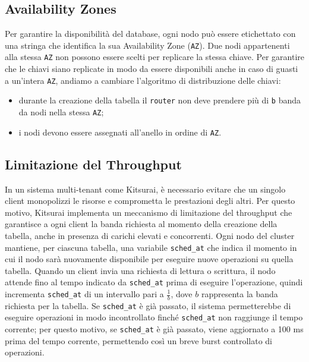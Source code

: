\subsection{Availability Zones}
\label{subsec:availability-zones}

Per garantire la disponibilità del database, ogni nodo può essere etichettato con una stringa che identifica la sua Availability Zone (\texttt{AZ}).
Due nodi appartenenti alla stessa \texttt{AZ} non possono essere scelti per replicare la stessa chiave.
Per garantire che le chiavi siano replicate in modo da essere disponibili anche in caso di guasti a un'intera \texttt{AZ}, andiamo a cambiare l'algoritmo di distribuzione delle chiavi:
\begin{itemize}
    \item durante la creazione della tabella il \texttt{router} non deve prendere più di \texttt{b} banda da nodi nella stessa \texttt{AZ};
    \item i nodi devono essere assegnati all'anello in ordine di \texttt{AZ}.
\end{itemize}

\subsection{Limitazione del Throughput}
\label{subsec:limitazione-throughput}

In un sistema multi-tenant come Kitsurai, è necessario evitare che un singolo client monopolizzi le risorse e comprometta le prestazioni degli altri.
Per questo motivo, Kitsurai implementa un meccanismo di limitazione del throughput che garantisce a ogni client la banda richiesta al momento della creazione della tabella, anche in presenza di carichi elevati e concorrenti.
Ogni nodo del cluster mantiene, per ciascuna tabella, una variabile \texttt{sched\_at} che indica il momento in cui il nodo sarà nuovamente disponibile per eseguire nuove operazioni su quella tabella.
Quando un client invia una richiesta di lettura o scrittura, il nodo attende fino al tempo indicato da \texttt{sched\_at} prima di eseguire l'operazione, quindi incrementa \texttt{sched\_at} di un intervallo pari a $\frac{1}{b}$, dove $b$ rappresenta la banda richiesta per la tabella.
Se \texttt{sched\_at} è già passato, il sistema permetterebbe di eseguire operazioni in modo incontrollato finché \texttt{sched\_at} non raggiunge il tempo corrente; per questo motivo, se \texttt{sched\_at} è già passato, viene aggiornato a 100 ms prima del tempo corrente, permettendo così un breve burst controllato di operazioni.

